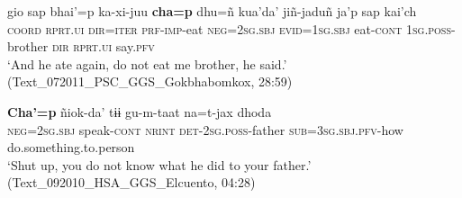 \documentclass[output=paper,draft,draftmode,colorlinks,citecolor=brown]{langscibook}
\begin{document}
\begin{xlist}
\item\gll gio sap bhai’=p ka-xi-juu \textbf{cha=p} dhu=ñ kua’da’ jiñ-jaduñ ja’p sap kai’ch\\
\textsc{coord} \textsc{rprt.ui} \textsc{dir=iter} \textsc{prf-imp}-eat \textsc{neg=2sg.sbj} \textsc{evid=1sg.sbj} eat-\textsc{cont} \textsc{1sg.poss}-brother \textsc{dir} \textsc{rprt.ui} say.\textsc{pfv}\\
\glt `And he ate again, do not eat me brother, he said.’ (Text\_072011\_PSC\_GGS\_Gokbhabomkox, 28:59)
\item\gll \textbf{Cha’=p} ñiok-da’ tɨɨ gu-m-taat na=t-jax dhoda\\
\textsc{neg=2sg.sbj} speak-\textsc{cont} \textsc{nrint} \textsc{det-2sg.poss}-father \textsc{sub=3sg.sbj.pfv}-how do.something.to.person\\
\glt ‘Shut up, you do not know what he did to your father.’ (Text\_092010\_HSA\_GGS\_Elcuento, 04:28)
\end{xlist}
\z
\end{document}
